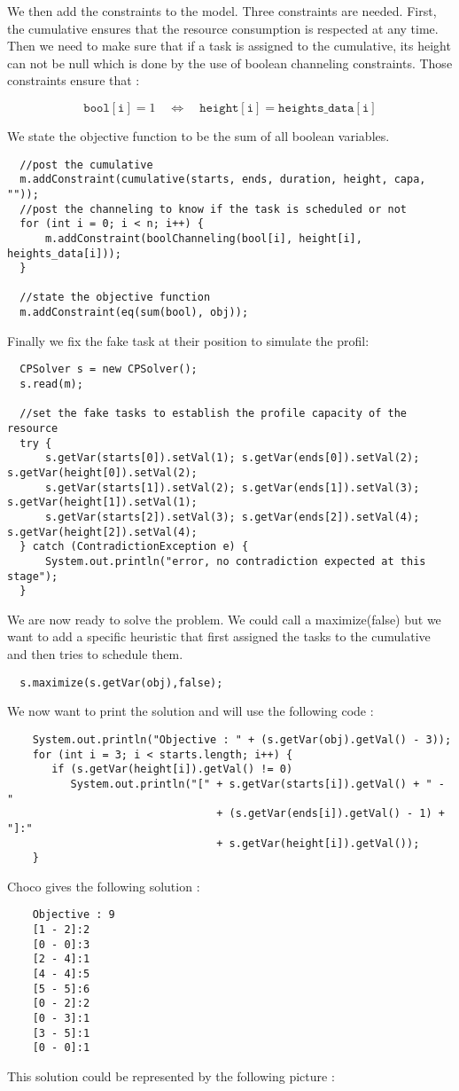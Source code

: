 We then add the constraints to the model. Three constraints are needed. First, the cumulative ensures that the resource consumption is respected at any time. Then we need to make sure that if a task is assigned to the cumulative, its height can not be null which is done by the use of boolean channeling constraints. Those constraints ensure that :

$$\mathtt{bool[i]} = 1 \quad\iff\quad \mathtt{height[i]} = \mathtt{heights\_data[i]}$$

We state the objective function to be the sum of all boolean variables. 
\begin{lstlisting}
  //post the cumulative
  m.addConstraint(cumulative(starts, ends, duration, height, capa, ""));                                                                            
  //post the channeling to know if the task is scheduled or not
  for (int i = 0; i < n; i++) {
      m.addConstraint(boolChanneling(bool[i], height[i], heights_data[i]));
  }
  
  //state the objective function
  m.addConstraint(eq(sum(bool), obj));
\end{lstlisting}

Finally we fix the fake task at their position to simulate the profil: 
\begin{lstlisting}
  CPSolver s = new CPSolver();
  s.read(m);
  
  //set the fake tasks to establish the profile capacity of the resource
  try {
      s.getVar(starts[0]).setVal(1); s.getVar(ends[0]).setVal(2); s.getVar(height[0]).setVal(2);
      s.getVar(starts[1]).setVal(2); s.getVar(ends[1]).setVal(3); s.getVar(height[1]).setVal(1);
      s.getVar(starts[2]).setVal(3); s.getVar(ends[2]).setVal(4); s.getVar(height[2]).setVal(4);
  } catch (ContradictionException e) {
      System.out.println("error, no contradiction expected at this stage");
  }
\end{lstlisting}
We are now ready to solve the problem. We could call a maximize(false) but we want to add a specific heuristic that first assigned the tasks to the cumulative and then tries to schedule them.
\begin{lstlisting}
  s.maximize(s.getVar(obj),false);
\end{lstlisting}
We now want to print the solution and will use the following code : 
\begin{lstlisting}
	System.out.println("Objective : " + (s.getVar(obj).getVal() - 3));
	for (int i = 3; i < starts.length; i++) {
	   if (s.getVar(height[i]).getVal() != 0)
	      System.out.println("[" + s.getVar(starts[i]).getVal() + " - " 
                                 + (s.getVar(ends[i]).getVal() - 1) + "]:" 
                                 + s.getVar(height[i]).getVal());
	}
\end{lstlisting}
Choco gives the following solution : 
\begin{lstlisting}
	Objective : 9
	[1 - 2]:2
	[0 - 0]:3
	[2 - 4]:1
	[4 - 4]:5
	[5 - 5]:6
	[0 - 2]:2
	[0 - 3]:1
	[3 - 5]:1
	[0 - 0]:1
\end{lstlisting}
This solution could be represented by the following picture :

